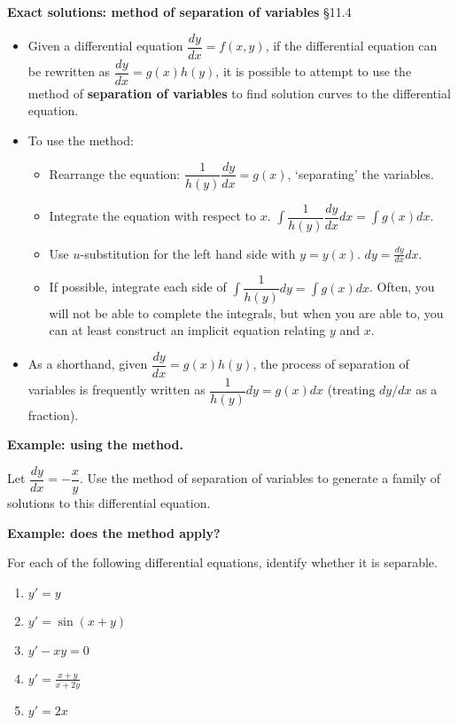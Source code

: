 \documentclass[12pt,letterpaper,noanswers]{exam}
\begin{document}
\eject

\noindent\textbf{Exact solutions: method of separation of variables} \S 11.4

\begin{tcolorbox}
\begin{itemize}
\itemsep0em
    \item Given a differential equation $\dfrac{dy}{dx} = f(x,y)$, if the differential equation can be rewritten as $\dfrac{dy}{dx} = g(x)h(y)$, it is possible to attempt to use the method of \textbf{separation of variables} to find solution curves to the differential equation.
    \item To use the method:
    \begin{itemize}
        \item Rearrange the equation: $\dfrac{1}{h(y)}\dfrac{dy}{dx} = g(x)$, `separating' the variables. 
        \item Integrate the equation with respect to $x$.  $\displaystyle\int \dfrac{1}{h(y)}\dfrac{dy}{dx}dx = \int g(x)dx$.
        \item Use $u$-substitution for the left hand side with $y = y(x)$. $dy = \frac{dy}{dx}dx$.
        \item If possible, integrate each side of $\displaystyle\int \dfrac{1}{h(y)}dy = \int g(x)dx$.  Often, you will not be able to complete the integrals, but when you are able to, you can at least construct an implicit equation relating $y$ and $x$.
    \end{itemize}
    \item As a shorthand, given $\dfrac{dy}{dx} = g(x)h(y)$, the process of separation of variables is frequently written as $\dfrac{1}{h(y)}dy = g(x)dx$ (treating $dy/dx$ as a fraction).
\end{itemize}
\end{tcolorbox}

\noindent\textbf{Example: using the method.} 

Let $\dfrac{dy}{dx} = -\dfrac{x}{y}$.  Use the method of separation of variables to generate a family of solutions to this differential equation.

\vspace{2in}

\noindent\textbf{Example: does the method apply?}

For each of the following differential equations, identify whether it is separable.

\begin{enumerate}
\itemsep2em
    \item $y' = y$
    \item $y' = \sin(x+y)$
    \item $y' - xy = 0$
    \item $y' = \frac{x+y}{x+2y}$
    \item $y' = 2x$
    \vspace{0.5in}
\end{enumerate}
\end{document}
